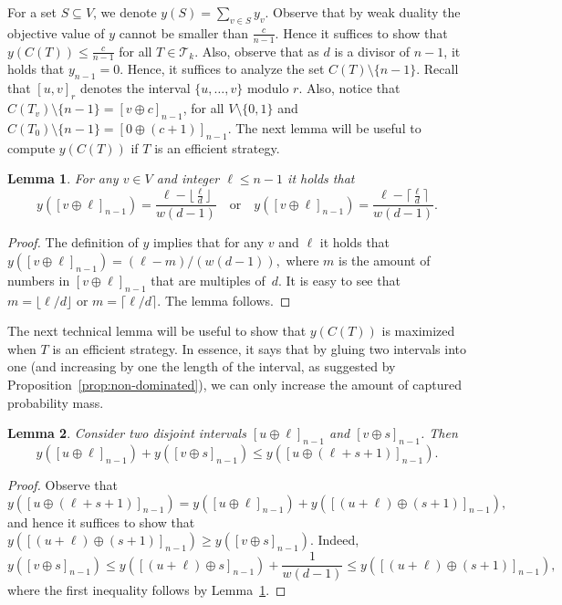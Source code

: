 \documentclass[11pt]{article}
\newtheorem{lemma}{Lemma}[section]
\newcommand\+{\mkern2mu}
\newcommand{\T}{T}
\begin{document}
For a set $S\subseteq V$, we denote $y(S)=\sum_{v\in S}y_v$. Observe that by weak duality the objective value of $y$ cannot be smaller than $\frac{c}{n-1}$. Hence it suffices to show that $y(C(T))\le \frac{c}{n-1}$ for all $T\in \mathcal{T}_k$. Also, observe that as $d$ is a divisor of $n-1$, it holds that $y_{n-1}=0$. Hence, it suffices to analyze the set $C(\T)\setminus\{n-1\}$. Recall that $[u,v]_r$ denotes the interval $\{u,\ldots,v\}$ modulo $r$. Also, notice that $C(\T_v)\setminus \{n-1\} = [v\oplus c]_{n-1}$, for all $V\setminus\{0,1\}$ and $C(\T_0)\setminus \{n-1\}=[0\oplus (c+1)]_{n-1}$. 
The next lemma will be useful to compute $y(C(\T))$ if $\T$ is an efficient strategy. 

\begin{lemma}\label{lm:yshift}
    For any $v\in V$ and integer $\ell\le n-1$ it holds that 
    $$  y([v\oplus\ell]_{n-1}) = \frac{\ell-\lfloor \frac{\ell}{d}\rfloor}{w(d-1)}\quad\text{or}\quad y([v\oplus \ell]_{n-1}) = \frac{\ell-\lceil \frac{\ell}{d}\rceil}{w(d-1)}. $$
\end{lemma}
\begin{proof}
    The definition of $y$ implies that for any $v$ and $\ell$ it holds that $y([v\oplus\ell]_{n-1}) = (\ell-m)/(w(d-1)),$ where $m$ is the amount of numbers in $[v\oplus \ell]_{n-1}$ that are multiples of~$d$. It is easy to see that $m= \lfloor \ell/d \rfloor$ or $m= \lceil \ell/d \rceil$. The lemma follows.
\end{proof}

The next technical lemma will be useful to show that  $y(C(\T))$ is maximized when $\T$ is an efficient strategy. In essence, it says that by gluing two intervals into one (and increasing by one the length of the interval, as suggested by Proposition~\ref{prop:non-dominated}), we can only increase the amount of captured probability mass.

\begin{lemma}\label{lm:ymerge}
Consider two disjoint intervals $[u\oplus\ell]_{n-1}$ and $[v\oplus s]_{n-1}$. Then 
$$y([u\oplus \ell]_{n-1})+y([v\oplus s]_{n-1})\le y([u\oplus (\ell+s+1)]_{n-1}).$$
\end{lemma}
\begin{proof}
Observe that 
$$y([u\oplus(\ell+s+1)]_{n-1})= y([u\oplus\ell]_{n-1})+y([(u+\ell)\oplus(s+1)]_{n-1}),$$
and hence it suffices to show that $y([(u+\ell)\oplus(s+1)]_{n-1}) \ge y([v\oplus s
]_{n-1})$. Indeed,
$$
  y([v\oplus s]_{n-1}) \le  y([(u+\ell) \oplus s]_{n-1}) + \frac{1}{w(d-1)} \le y([(u+\ell) \oplus (s+1)]_{n-1}),
$$
 where the first inequality follows by Lemma~\ref{lm:yshift}.
\end{proof}
\end{document}
